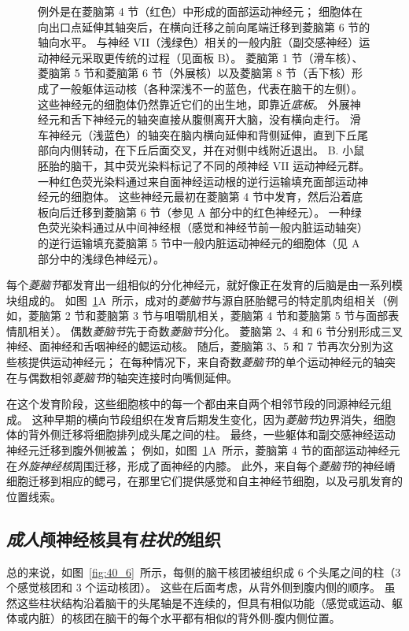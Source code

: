 \begin{figure}[htbp]
{		例外是在菱脑第 4 节（红色）中形成的面部运动神经元；
		细胞体在向出口点延伸其轴突后，在横向迁移之前向尾端迁移到菱脑第 6 节的轴向水平。
		与神经 VII（浅绿色）相关的一般内脏（副交感神经）运动神经元采取更传统的过程（见面板 B）。
		菱脑第 1 节（滑车核）、菱脑第 5 节和菱脑第 6 节（外展核）以及菱脑第 8 节（舌下核）形成了一般躯体运动核（各种深浅不一的蓝色，代表在脑干的左侧）。
		这些神经元的细胞体仍然靠近它们的出生地，即靠近\textit{底板}。
		外展神经元和舌下神经元的轴突直接从腹侧离开大脑，没有横向走行。
		滑车神经元（浅蓝色）的轴突在脑内横向延伸和背侧延伸，直到下丘尾部向内侧转动，在下丘后面交叉，并在对侧中线附近退出。
		B. 小鼠胚胎的脑干，其中荧光染料标记了不同的颅神经 VII 运动神经元群。
		一种红色荧光染料通过来自面神经运动根的逆行运输填充面部运动神经元的细胞体。
		这些神经元最初在菱脑第 4 节中发育，然后沿着底板向后迁移到菱脑第 6 节（参见 A 部分中的红色神经元）。
		一种绿色荧光染料通过从中间神经根（感觉和神经节前一般内脏运动轴突）的逆行运输填充菱脑第 5 节中一般内脏运动神经元的细胞体（见 A 部分中的浅绿色神经元）。}
	\label{fig:40_5}
\end{figure}


每个\textit{菱脑节}都发育出一组相似的分化神经元，就好像正在发育的后脑是由一系列模块组成的。
如图~\ref{fig:40_5}A~所示，成对的\textit{菱脑节}与源自胚胎鳃弓的特定肌肉组相关（例如，菱脑第 2 节和菱脑第 3 节与咀嚼肌相关，菱脑第 4 节和菱脑第 5 节与面部表情肌相关）。
偶数\textit{菱脑节}先于奇数\textit{菱脑节}分化。
菱脑第 2、4 和 6 节分别形成三叉神经、面神经和舌咽神经的鳃运动核。
随后，菱脑第 3、5 和 7 节再次分别为这些核提供运动神经元；
在每种情况下，来自奇数\textit{菱脑节}的单个运动神经元的轴突在与偶数相邻\textit{菱脑节}的轴突连接时向嘴侧延伸。


在这个发育阶段，这些细胞核中的每一个都由来自两个相邻节段的同源神经元组成。
这种早期的横向节段组织在发育后期发生变化，因为\textit{菱脑节}边界消失，细胞体的背外侧迁移将细胞排列成头尾之间的柱。
最终，一些躯体和副交感神经运动神经元迁移到腹外侧被盖；
例如，如图~\ref{fig:40_5}A~所示，菱脑第 4 节的面部运动神经元在\textit{外旋神经核}周围迁移，形成了面神经的内膝。
此外，来自每个\textit{菱脑节}的神经嵴细胞迁移到相应的鳃弓，在那里它们提供感觉和自主神经节细胞，以及弓肌发育的位置线索。



\subsection{\textit{成人}颅神经核具有\textit{柱状的}组织}

总的来说，如图~\ref{fig:40_6}~所示，每侧的脑干核团被组织成 6 个头尾之间的柱（3 个感觉核团和 3 个运动核团）。
这些在后面考虑，从背外侧到腹内侧的顺序。
虽然这些柱状结构沿着脑干的头尾轴是不连续的，但具有相似功能（感觉或运动、躯体或内脏）的核团在脑干的每个水平都有相似的背外侧-腹内侧位置。


